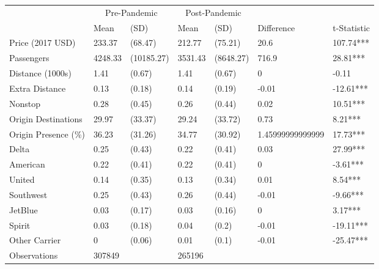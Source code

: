 
\begin{tabular}[t]{lllllll}
\toprule
\multicolumn{1}{c}{ } & \multicolumn{2}{c}{Pre-Pandemic} & \multicolumn{2}{c}{Post-Pandemic} & \multicolumn{2}{c}{ } \\
\cmidrule(l{3pt}r{3pt}){2-3} \cmidrule(l{3pt}r{3pt}){4-5}
 & Mean & (SD) & Mean & (SD) & Difference & t-Statistic\\
\midrule
Price (2017 USD) & 233.37 & (68.47) & 212.77 & (75.21) & 20.6 & 107.74***\\
Passengers & 4248.33 & (10185.27) & 3531.43 & (8648.27) & 716.9 & 28.81***\\
Distance (1000s) & 1.41 & (0.67) & 1.41 & (0.67) & 0 & -0.11\\
Extra Distance & 0.13 & (0.18) & 0.14 & (0.19) & -0.01 & -12.61***\\
Nonstop & 0.28 & (0.45) & 0.26 & (0.44) & 0.02 & 10.51***\\
\addlinespace
Origin Destinations & 29.97 & (33.37) & 29.24 & (33.72) & 0.73 & 8.21***\\
Origin Presence (\%) & 36.23 & (31.26) & 34.77 & (30.92) & 1.45999999999999 & 17.73***\\
Delta & 0.25 & (0.43) & 0.22 & (0.41) & 0.03 & 27.99***\\
American & 0.22 & (0.41) & 0.22 & (0.41) & 0 & -3.61***\\
United & 0.14 & (0.35) & 0.13 & (0.34) & 0.01 & 8.54***\\
\addlinespace
Southwest & 0.25 & (0.43) & 0.26 & (0.44) & -0.01 & -9.66***\\
JetBlue & 0.03 & (0.17) & 0.03 & (0.16) & 0 & 3.17***\\
Spirit & 0.03 & (0.18) & 0.04 & (0.2) & -0.01 & -19.11***\\
Other Carrier & 0 & (0.06) & 0.01 & (0.1) & -0.01 & -25.47***\\
Observations & 307849 &  & 265196 &  &  & \\
\bottomrule
\end{tabular}

